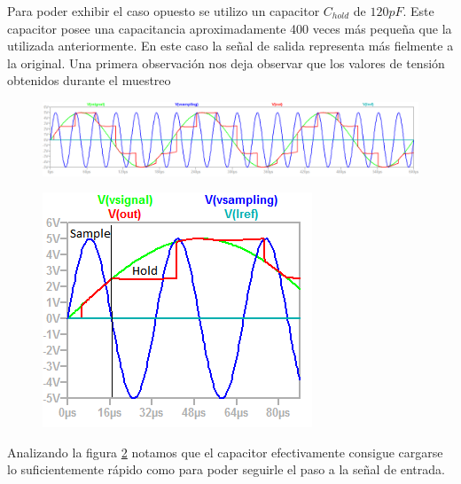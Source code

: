 Para poder exhibir el caso opuesto se utilizo un capacitor $C_{hold}$ de $120pF$. Este capacitor posee una capacitancia aproximadamente 400 veces más pequeña que la utilizada anteriormente.
En este caso la señal de salida representa más fielmente a la original. Una primera observación nos deja observar que los valores de tensión obtenidos durante el muestreo  

\begin{figure}[H]
	\centering
	\includegraphics[width=\linewidth]{ImagenesEjercicio4/ChTests/Vin1_30ksamplig120pF}
	\caption{}
	\label{fig:vin130ksamplig120pf}
\end{figure}


\begin{figure}[H]
	\centering
	\includegraphics[]{ImagenesEjercicio4/ChTests/Vin1_30ksamplig120pFZoom2}
	\caption{}
	\label{fig:vin130ksamplig120pfzoom}
\end{figure}


Analizando la figura \ref{fig:vin130ksamplig120pfzoom} notamos que el capacitor efectivamente consigue cargarse lo suficientemente rápido como para poder seguirle el paso a la señal de entrada. 


